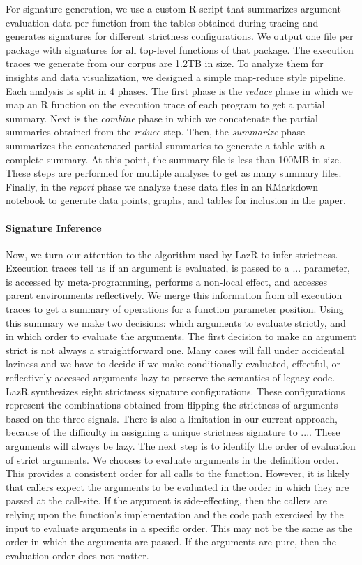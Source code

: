 \documentclass[review,nonacm,screen,acmsmall,anonymous=true]{acmart}
\newcommand{\lazr}{{\sf LazR}\xspace}
\begin{document}
For signature generation, we use a custom R script that summarizes argument
evaluation data per function from the tables obtained during tracing and
generates signatures for different strictness configurations. We output one file
per package with signatures for all top-level functions of that package.
The execution traces we generate from our corpus are 1.2TB in size. To analyze
them for insights and data visualization, we designed a simple map-reduce style
pipeline. Each analysis is split in 4 phases. The first phase is the
\emph{reduce} phase in which we map an R function on the execution trace of each
program to get a partial summary. Next is the \emph{combine} phase in which we
concatenate the partial summaries obtained from the \emph{reduce} step. Then,
the \emph{summarize} phase summarizes the concatenated partial summaries to
generate a table with a complete summary. At this point, the summary file is
less than 100MB in size. These steps are performed for multiple analyses to get
as many summary files. Finally, in the \emph{report} phase we analyze these data
files in an RMarkdown notebook to generate data points, graphs, and tables for
inclusion in the paper.

\paragraph{Signature Inference}

Now, we turn our attention to the algorithm used by \lazr to infer strictness.
Execution traces tell us if an argument is
evaluated, is passed to a $...$ parameter, is
accessed by meta-programming, performs a non-local effect, and accesses
parent environments reflectively. We merge this information from all
execution traces to get a summary of operations for a function parameter
position. Using this summary we make two decisions: which
arguments to evaluate strictly, and in which order to evaluate the arguments.
The first decision to make an argument strict is not always a straightforward
one. Many cases will fall under accidental laziness and we have to decide
if we make conditionally evaluated, effectful, or reflectively accessed
arguments lazy to preserve the semantics of legacy code.
\lazr synthesizes eight strictness signature configurations.
These configurations represent the combinations obtained
from flipping the strictness of arguments based on the three signals.
There is also a
limitation in our current approach, because of the difficulty in assigning a
unique strictness signature to $...$. These arguments will always be lazy.
The next step is to identify the order of evaluation of strict arguments. We
chooses to evaluate arguments in the definition order. This provides a
consistent order for all calls to the function. However, it is likely that
callers expect the arguments to be evaluated in the order in which they are
passed at the call-site. If the argument is side-effecting, then the callers are
relying upon the function's implementation and the code path exercised by the
input to evaluate arguments in a specific order. This may not be the same as the
order in which the arguments are passed. If the arguments are pure, then the
evaluation order does not matter.
\end{document}
